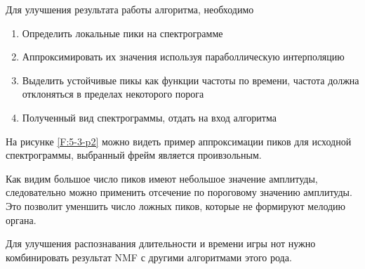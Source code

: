 \documentclass[oneside, final, 12pt]{extarticle}
\begin{document}
Для улучшения результата работы алгоритма, необходимо
\begin{enumerate}
  \item Определить локальные пики на спектрограмме
  \item Аппроксимировать их значения используя параболлическую интерполяцию
  \item Выделить устойчивые пикы как функции частоты по времени,
    частота должна отклоняться в пределах некоторого порога
  \item Полученный вид спектрограммы, отдать на вход алгоритма
\end{enumerate}

На рисунке \ref{F:5-3-p2} можно видеть пример аппроксимации пиков
для исходной спектрограммы, выбранный фрейм является проивзольным.

Как видим большое число пиков имеют небольшое значение амплитуды, следовательно
можно применить отсечение по пороговому значению амплитуды. Это позволит
уменшить число ложных пиков, которые не формируют мелодию органа.

Для улучшения распознавания длительности и времени игры нот
нужно комбинировать результат NMF с другими алгоритмами этого рода.

\cleardoublepage





\cleardoublepage
\end{document}
